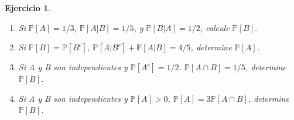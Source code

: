 \documentclass[12pt,twoside]{article}
\newtheorem{Ejer}{Ejercicio}
\newcommand{\Prob}{\mathbb{P}}
\begin{document}
\begin{Ejer}
\begin{enumerate}
\item Si $\Prob\left[A\right]=1/3$, $\Prob\left[A|B\right]=1/5$, y $\Prob\left[B|A\right]=1/2$, calcule $\Prob\left[B\right]$.

\item Si $\Prob\left[B\right]=\Prob\left[B^{c}\right]$, $\Prob\left[A|B^{c}\right]+\Prob\left[A|B\right]=4/5$, determine $\Prob\left[A\right]$.

\item Si A y B son independientes y $\Prob\left[A^{c}\right]=1/2$. $\Prob\left[A\cap B\right]=1/5$, determine $\Prob\left[B\right]$.

\item Si A y B son independientes y $\Prob\left[A\right]>0$, $\Prob\left[A\right]=3\Prob\left[A\cap B\right]$, determine $\Prob\left[B\right]$.

\end{enumerate}
\end{Ejer}
\end{document}

